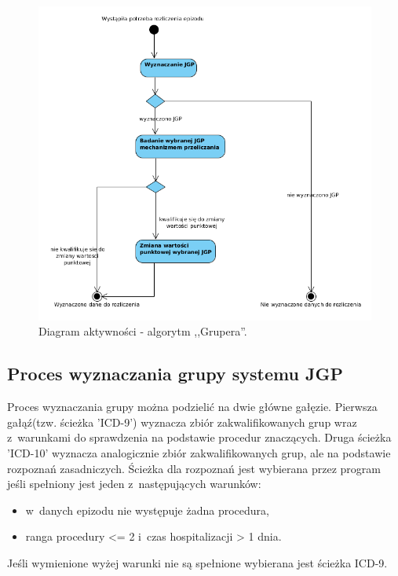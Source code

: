 \begin{figure}[!ht]
\centering
\includegraphics[scale=0.4]{images/activity-gruper}
\caption[Diagram aktywności]{Diagram aktywności - algorytm ,,Grupera''.}
\label{img:diagram_activity_gruper}
\end{figure}

\newpage
\subsection{Proces wyznaczania grupy systemu JGP}
\label{sec:procesWyznaczaniaGrupySystemuJGP}
Proces wyznaczania grupy można podzielić na dwie główne gałęzie. Pierwsza gałąź(tzw. ścieżka 'ICD-9') wyznacza zbiór zakwalifikowanych grup wraz z~warunkami do sprawdzenia na podstawie procedur znaczących. Druga ścieżka 'ICD-10' wyznacza analogicznie zbiór zakwalifikowanych grup, ale na podstawie rozpoznań zasadniczych. Ścieżka dla rozpoznań jest wybierana przez program jeśli spełniony jest jeden z~następujących warunków:
\begin{itemize}\itemsep2pt
\item w~danych epizodu nie występuje żadna procedura,
\item ranga procedury <= 2 i~czas hospitalizacji > 1 dnia.
\end{itemize}
Jeśli wymienione wyżej warunki nie są spełnione wybierana jest ścieżka ICD-9\cite{algorytm_grupera}.


